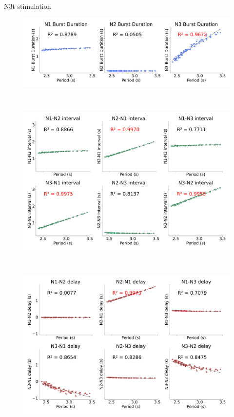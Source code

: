 \documentclass[aspectratio=43]{beamer}
\begin{document}
\begin{frame}{N3t stimulation}
\begin{figure}[hbt!]
\begin{minipage}[b]{0.36\textwidth}
		\end{minipage}
		\begin{minipage}[b]{0.44\textwidth}
			\centering
			\begin{minipage}[b]{\textwidth}
				\centering
				\includegraphics[width=\textwidth]{invariants/data/MODEL/n3t_driven/images/3phases/_durations.pdf}
			\end{minipage}\
			\begin{minipage}[b]{\textwidth}
				\centering
				\includegraphics[width=\textwidth]{invariants/data/MODEL/n3t_driven/images/3phases/_intervals.pdf}
			\end{minipage}\
			\begin{minipage}[b]{\textwidth}
				\centering
				\includegraphics[width=\textwidth]{invariants/data/MODEL/n3t_driven/images/3phases/_delays.pdf}

\end{minipage}
\end{minipage}
\end{figure}
\end{frame}
\end{document}

